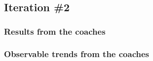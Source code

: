 \subsection{Iteration \#2}


    \subsubsection{Results from the coaches}

    \subsubsection{Observable trends from the coaches}

